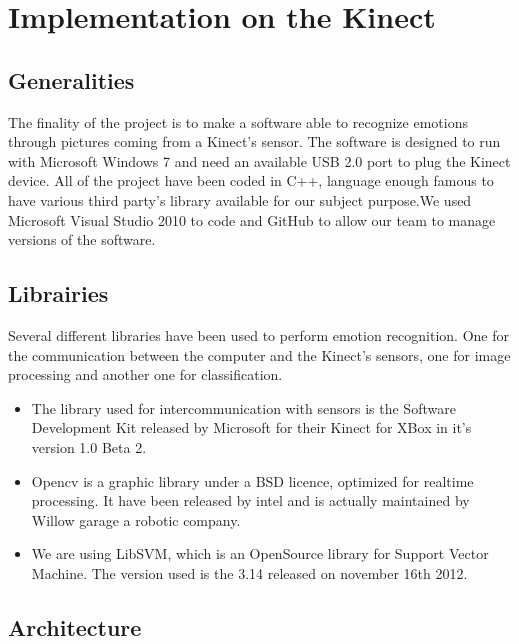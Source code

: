 \chapter{Implementation on the Kinect}
\label{chap:implementation_kinect}

\section{Generalities}
\vspace{\baselineskip}
\noindent The finality of the project is to make a software able to recognize emotions through pictures coming from a Kinect's sensor. The software is designed to run with Microsoft Windows 7 and need an available USB 2.0 port to plug the Kinect device. All of the project have been coded in C++, language enough famous to have various third party's library available for our subject purpose.\newline We used Microsoft Visual Studio 2010 to code and GitHub to allow our team to manage versions of the software.

\section{Librairies}
\vspace{\baselineskip}
\noindent Several different libraries have been used to perform emotion recognition. One for the communication between the computer and the Kinect's sensors, one for image processing and another one for classification.


\begin{itemize}
  \item The library used for intercommunication with sensors is the Software Development Kit released by Microsoft for their Kinect for XBox in it's version 1.0 Beta 2.
  \item Opencv is a graphic library under a BSD licence, optimized for realtime processing. It have been released by intel and is actually maintained by Willow garage a robotic company.
  \item We are using LibSVM, which is an OpenSource library for Support Vector Machine. The version used is the 3.14 released on november 16th 2012.
\end{itemize}

\section{Architecture}

